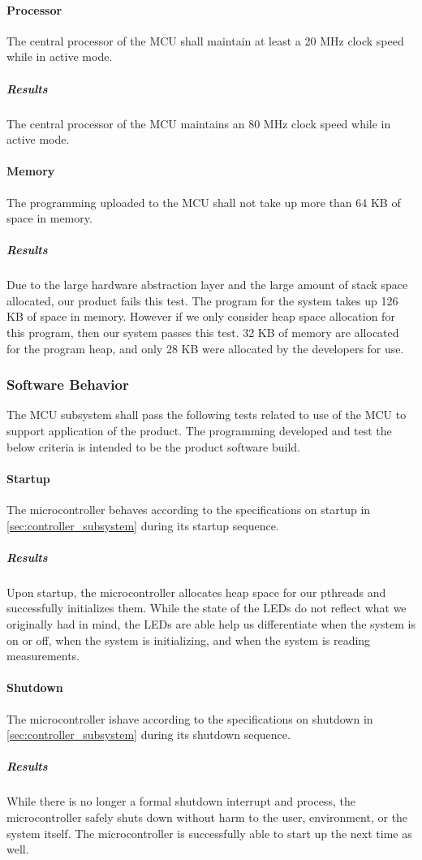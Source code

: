 \paragraph{Processor} The central processor of the MCU shall maintain at
least a 20 MHz clock speed while in active mode.
\subparagraph{Results} The central processor of the MCU maintains an 80 MHz clock speed while in active mode.

\paragraph{Memory} The programming uploaded to the MCU shall not take up
more than 64 KB of space in memory.
\subparagraph{Results} Due to the large hardware abstraction layer and the large amount of stack space allocated, our product fails this test. The program for the system takes up 126 KB of space in memory. However if we only consider heap space allocation for this program, then our system passes this test. 32 KB of memory are allocated for the program heap, and only 28 KB were allocated by the developers for use.

\subsubsection{Software Behavior} The MCU subsystem shall pass the following tests related to use of the MCU to support application of the product. The programming developed and test the below criteria is intended to be the product software build.

\paragraph{Startup} The microcontroller behaves according to the specifications on startup in \autoref{sec:controller_subsystem} during its startup sequence.
\subparagraph{Results} Upon startup, the microcontroller allocates heap space for our pthreads and successfully initializes them. While the state of the LEDs do not reflect what we originally had in mind, the LEDs are able help us differentiate when the system is on or off, when the system is initializing, and when the system is reading measurements.

\paragraph{Shutdown} The microcontroller ishave according to the specifications on shutdown in \autoref{sec:controller_subsystem} during its shutdown sequence.
\subparagraph{Results} While there is no longer a formal shutdown interrupt and process, the microcontroller safely shuts down without harm to the user, environment, or the system itself. The microcontroller is successfully able to start up the next time as well.

